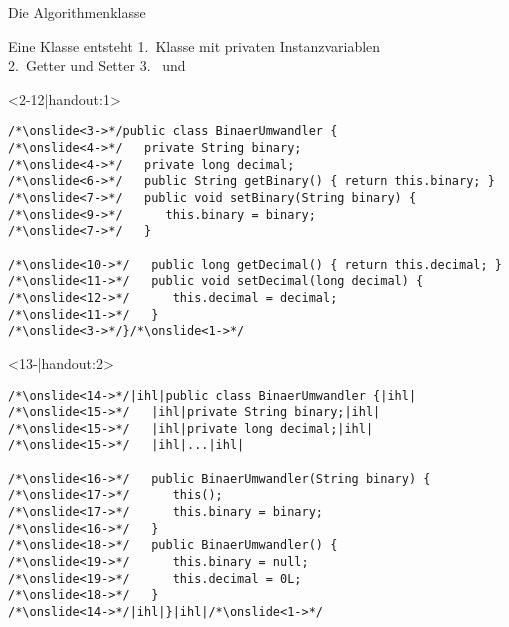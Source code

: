 \begin{frame}[c]{Die Algorithmenklasse}
%
\end{frame}
\SidebarReset
\SidebarSolution
\begin{frame}[fragile,c]{Eine Klasse entsteht}
 {1.~Klasse  mit privaten Instanzvariablen\smallskip\\
 {2.~Getter und Setter}}
 {3.~ und }
\medskip
\SetupLstHl
\begin{onlyenv}<2-12|handout:1>
\begin{verbatim}
/*\onslide<3->*/public class BinaerUmwandler {
/*\onslide<4->*/   private String binary;
/*\onslide<4->*/   private long decimal;
/*\onslide<6->*/   public String getBinary() { return this.binary; }
/*\onslide<7->*/   public void setBinary(String binary) {
/*\onslide<9->*/      this.binary = binary;
/*\onslide<7->*/   }

/*\onslide<10->*/   public long getDecimal() { return this.decimal; }
/*\onslide<11->*/   public void setDecimal(long decimal) {
/*\onslide<12->*/      this.decimal = decimal;
/*\onslide<11->*/   }
/*\onslide<3->*/}/*\onslide<1->*/
\end{verbatim}
\end{onlyenv}
\begin{onlyenv}<13-|handout:2>
\begin{verbatim}
/*\onslide<14->*/|ihl|public class BinaerUmwandler {|ihl|
/*\onslide<15->*/   |ihl|private String binary;|ihl|
/*\onslide<15->*/   |ihl|private long decimal;|ihl|
/*\onslide<15->*/   |ihl|...|ihl|

/*\onslide<16->*/   public BinaerUmwandler(String binary) {
/*\onslide<17->*/      this();
/*\onslide<17->*/      this.binary = binary;
/*\onslide<16->*/   }
/*\onslide<18->*/   public BinaerUmwandler() {
/*\onslide<19->*/      this.binary = null;
/*\onslide<19->*/      this.decimal = 0L;
/*\onslide<18->*/   }
/*\onslide<14->*/|ihl|}|ihl|/*\onslide<1->*/
\end{verbatim}
\end{onlyenv}
\end{frame}
\SidebarReset

